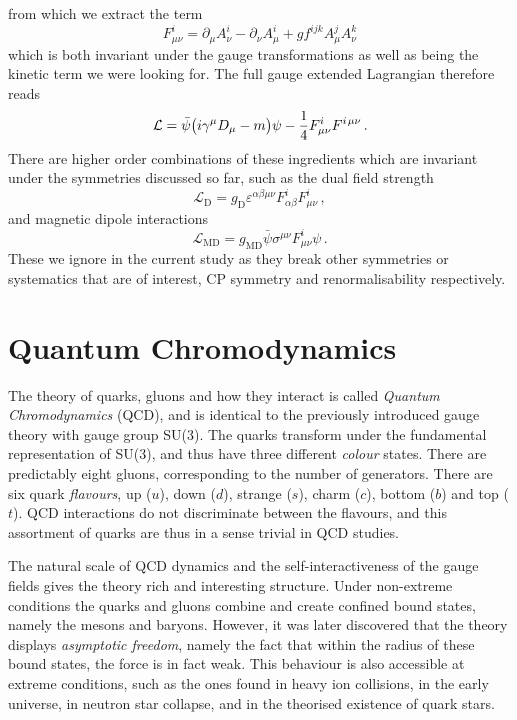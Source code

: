 %
from which we extract the term
%
\begin{equation} \label{eq:field_strength}
  F_{\mu\nu}^i = \partial_{\mu} A^i_{\nu} - \partial_{\nu}
    A^i_{\mu} + g f^{ijk} A^j_{\mu} A^k_{\nu}
\end{equation}
%
which is both invariant under the gauge transformations as well as being the
kinetic term we were looking for. The full gauge extended Lagrangian therefore
reads
%
\begin{equation} \label{eq:gauge_lagrangian}
  \mathcal{L} = \bar{\psi}\big(i \gamma^{\mu} D_{\mu} - m\big)\psi 
    - \frac{1}{4} F^i_{\mu\nu} F^{i\hskip.2ex\mu\nu} \,.
\end{equation}
%
There are higher order combinations of these ingredients which are invariant
under the symmetries discussed so far, such as the dual field strength
%
\begin{equation}
  \mathcal{L}_{\mathrm{D}} = g_{\mathrm{D}} \varepsilon^{\alpha\beta\mu\nu}
    F^i_{\alpha\beta} F^i_{\mu\nu}\,,
\end{equation}
%
and magnetic dipole interactions
%
\begin{equation}
  \mathcal{L}_{\mathrm{MD}} = g_{\mathrm{MD}} \bar{\psi} \sigma^{\mu\nu} F^i_{\mu\nu} \psi\,.
\end{equation}
%
These we ignore in the current study as they break other symmetries or
systematics that are of interest, CP symmetry and renormalisability
respectively.

\section{Quantum Chromodynamics}

The theory of quarks, gluons and how they interact is called \emph{Quantum
Chromodynamics} (QCD), and is identical to the previously introduced gauge
theory with gauge group SU($3$). The quarks transform under the fundamental
representation of SU($3$), and thus have three different \emph{colour} states.
There are predictably eight gluons, corresponding to the number of generators.
There are six quark \emph{flavours}, up ($u$), down ($d$), strange ($s$), charm
($c$), bottom ($b$) and top ($t$). QCD interactions do not discriminate between
the flavours, and this assortment of quarks are thus in a sense trivial in QCD
studies.

The natural scale of QCD dynamics and the self-interactiveness of the gauge
fields gives the theory rich and interesting structure. Under non-extreme
conditions the quarks and gluons combine and create confined bound states,
namely the mesons and baryons. However, it was later discovered that the theory
displays \emph{asymptotic freedom}, namely the fact that within the radius of
these bound states, the force is in fact weak. This behaviour is also accessible
at extreme conditions, such as the ones found in heavy ion collisions, in the
early universe, in neutron star collapse, and in the theorised existence of
quark stars.

